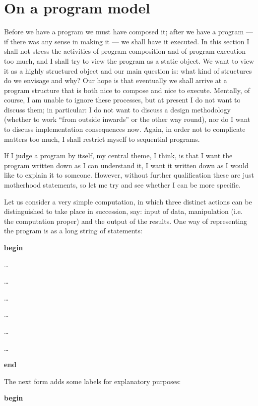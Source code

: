 \section{On a program model}
\label{eq:program-model}

Before we have a program we must have composed it; after we have a program --- if there was any sense in making it --- we shall have it executed. In this section I shall not stress the activities of program composition and of program execution too much, and I shall try to view the program as a static object. We want to view it as a highly structured object and our main question is: what kind of structures do we envisage and why? Our hope is that eventually we shall arrive at a program structure that is both nice to compose and nice to execute. Mentally, of course, I am unable to ignore these processes, but at present I do not want to discuss them; in particular: I do not want to discuss a design methodology (whether to work ``from outside inwards'' or the other way round), nor do I want to discuss implementation consequences now. Again, in order not to complicate matters too much, I shall restrict myself to sequential programs.

If I judge a program by itself, my central theme, I think, is that I want the program written down as I can understand it, I want it written down as I would like to explain it to someone. However, without further qualification these are just motherhood statements, so let me try and see whether I can be more specific.

Let us consider a very simple computation, in which three distinct actions can be distinguished to take place in succession, say: input of data, manipulation (i.e. the computation proper) and the output of the results. One way of representing the program is as a long string of statements:

\noindent
\textbf{begin}

\noindent
\quad\dots

\noindent
\quad\dots

\noindent
\quad\dots

\noindent
\quad\dots

\noindent
\quad\dots

\noindent
\quad\dots

\noindent
\textbf{end}

The next form adds some labels for explanatory purposes:

\noindent
\tabto{10em}\textbf{begin}
\nopagebreak


